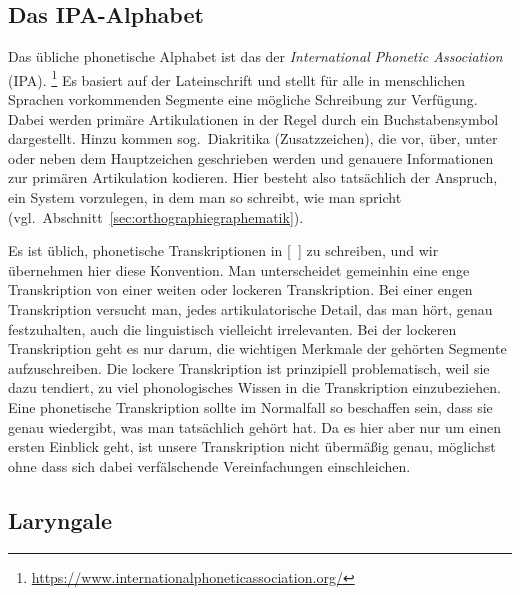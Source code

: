 
\subsection{Das IPA-Alphabet}

\label{sec:ipaalphabet}


Das übliche phonetische Alphabet ist das der \textit{International Phonetic Association} (IPA).%
\footnote{\url{https://www.internationalphoneticassociation.org/}}	
Es basiert auf der Lateinschrift und stellt für alle in menschlichen Sprachen vorkommenden Segmente eine mögliche Schreibung zur Verfügung.
Dabei werden primäre Artikulationen in der Regel durch ein Buchstabensymbol dargestellt.
Hinzu kommen sog.\ Diakritika (Zusatzzeichen), die vor, über, unter oder neben dem Hauptzeichen geschrieben werden und genauere Informationen zur primären Artikulation kodieren.
Hier besteht also tatsächlich der Anspruch, ein System vorzulegen, in dem man so schreibt, wie man spricht (vgl.\ Abschnitt~\ref{sec:orthographiegraphematik}).

Es ist üblich, phonetische Transkriptionen in [~] zu schreiben, und wir übernehmen hier diese Konvention.
Man unterscheidet gemeinhin eine enge Transkription von einer weiten oder lockeren Transkription.
Bei einer engen Transkription versucht man, jedes artikulatorische Detail, das man hört, genau festzuhalten, auch die linguistisch vielleicht irrelevanten.
Bei der lockeren Transkription geht es nur darum, die wichtigen Merkmale der gehörten Segmente aufzuschreiben.
Die lockere Transkription ist prinzipiell problematisch, weil sie dazu tendiert, zu viel phonologisches Wissen in die Transkription einzubeziehen.
Eine phonetische Transkription sollte im Normalfall so beschaffen sein, dass sie genau wiedergibt, was man tatsächlich gehört hat.
Da es hier aber nur um einen ersten Einblick geht, ist unsere Transkription nicht übermäßig genau, möglichst ohne dass sich dabei verfälschende Vereinfachungen einschleichen.

\subsection{Laryngale}

\label{sec:laryngale}



